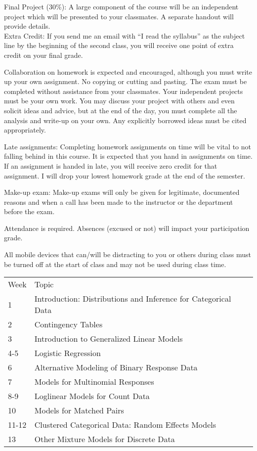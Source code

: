 \documentclass[10pt]{article}
\begin{document}
\noindent Final Project (30\%): A large component of the course will be an independent project which will be presented to your classmates. A separate handout will provide details. \\


\noindent Extra Credit: If you send me an email with ``I read the syllabus'' as the subject line by the beginning of the second class, you will receive one point of extra credit on your final grade. 

\bigskip
{}

Collaboration on homework is expected and encouraged, although you must write up your own assignment. No copying or cutting and pasting. The exam must be completed without assistance from your classmates. Your independent projects must be your own work. You may discuss your project with others and even solicit ideas and advice, but at the end of the day, you must complete all the analysis and write-up on your own. Any explicitly borrowed ideas must be cited appropriately.

Late assignments: Completing homework assignments on time will be vital to not falling behind in this course. It is expected that you hand in assignments on time. If an assignment is handed in late, you will receive zero credit for that assignment. I will drop your lowest homework grade at the end of the semester.

Make-up exam: Make-up exams will only be given for legitimate, documented reasons and when a call has been made to the instructor or the department before the exam.

Attendance is required. Absences (excused or not) will impact your participation grade.

All mobile devices that can/will be distracting to you or others during class must be turned off at the start of class and may not be used during class time.
  
  \clearpage
  
  {
\bigskip
{}
  \begin{table}[htp]
\begin{tabular}{ll}
Week & Topic \\
1 & Introduction: Distributions and Inference for Categorical Data \\
2 & Contingency Tables \\
3 & Introduction to Generalized Linear Models \\
4-5 & Logistic Regression \\
6 & Alternative Modeling of Binary Response Data \\
7 & Models for Multinomial Responses \\
8-9 & Loglinear Models for Count Data \\
10 & Models for Matched Pairs \\
11-12 & Clustered Categorical Data: Random Effects Models \\
13 & Other Mixture Models for Discrete Data
\end{tabular}
\end{table}%
}
\end{document}
